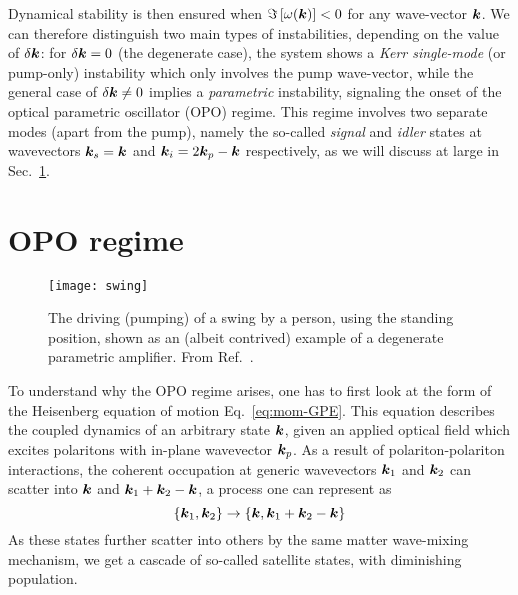 Dynamical stability is then ensured when
$\Im\left[\omega(\bm{k})\right] < 0$ for any wave-vector $\bm{k}$.  We can
therefore distinguish two main types of instabilities, depending on
the value of $\delta\bm{k}$: for $\delta\bm{k} =0$ (the degenerate case),
the system shows a \textit{Kerr single-mode} (or pump-only)
instability which only involves the pump wave-vector, while the
general case of $\delta\bm{k} \neq 0$ implies a \textit{parametric}
instability, signaling the onset of the optical parametric oscillator
(OPO) regime. This regime involves two separate modes (apart from the
pump), namely the so-called \textit{signal} and \textit{idler} states
at wavevectors $\bm{k}_s = \bm{k}$ and $\bm{k}_i = 2\bm{k}_p - \bm{k}$ respectively,
as we will discuss at large in Sec.~\ref{sec:opo}.



\section{OPO regime}
\label{sec:opo}
%
\begin{figure}[tb]\centering
  \texttt{[image: swing]}
  \caption{
    The driving (pumping) of a swing by a person, using the standing
    position, shown as an (albeit contrived) example of a degenerate
    parametric amplifier. From Ref.~\cite{yamamoto2004fundamentals}.
  }\label{fig:opo-swing}
\end{figure}
% 
To understand why the OPO regime arises, one has to first look at the
form of the Heisenberg equation of motion Eq.~\eqref{eq:mom-GPE}. This
equation describes the coupled dynamics of an arbitrary state $\bm{k}$,
given an applied optical field which excites polaritons with in-plane
wavevector $\bm{k}_p$. As a result of polariton-polariton interactions,
the coherent occupation at generic wavevectors $\bm{k}_1$ and $\bm{k}_2$ can
scatter into $\bm{k}$ and $\bm{k}_1 + \bm{k}_2 - \bm{k}$, a process one can
represent as
%
\begin{equation}\label{eq:scattering-cascade}
  \left\{\bm{k}_1, \bm{k}_2\right\} \rightarrow \left\{\bm{k}, \bm{k}_1 + \bm{k}_2 - \bm{k}\right\}
\end{equation}
% 
As these states further scatter into others by the same matter
wave-mixing mechanism, we get a cascade of so-called satellite states,
with diminishing population.  

